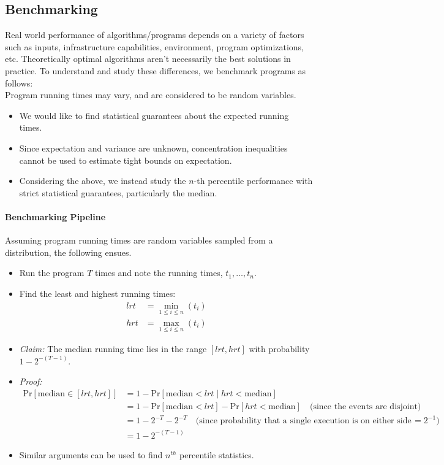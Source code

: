 \documentclass[12pt]{article}
\begin{document}
\subsection{Benchmarking}
Real world performance of algorithms/programs depends on a variety of factors such as inputs, infrastructure capabilities, environment, program optimizations, etc.  
Theoretically optimal algorithms aren't necessarily the best solutions in practice. To understand and study these differences, we benchmark programs as follows: \\ 
Program running times may vary, and are considered to be random variables.
\begin{itemize}
    \item We would like to find statistical guarantees about the expected running times.
    \item Since expectation and variance are unknown, concentration inequalities cannot be used to estimate tight bounds on expectation.
    \item Considering the above, we instead study the $n$-th percentile performance with strict statistical guarantees, particularly the median.
\end{itemize}

\paragraph{Benchmarking Pipeline}
Assuming program running times are random variables sampled from a distribution, the following ensues.
\begin{itemize}
    \item Run the program $T$ times and note the running times, $t_1, \dots, t_n$.
    \item Find the least and highest running times:
    \begin{align*}
        lrt &= \min_{1 \leq i \leq n} (t_i) \\
        hrt &= \max_{1 \leq i \leq n} (t_i)
    \end{align*}
    \item \textit{Claim:} The median running time lies in the range $[lrt, hrt]$ with probability $1 - 2^{-(T - 1)}$.
    \item \textit{Proof:}
    \begin{align*}
        \text{Pr}[\text{median} \in [lrt, hrt]] &= 1 - \text{Pr}[\text{median} < lrt \mid hrt < \text{median}] \\
                                                &= 1 - \text{Pr}[\text{median} < lrt] - \text{Pr}[hrt < \text{median}] \quad \text{(since the events are disjoint)} \\
                                                &= 1 - 2^{-T} - 2^{-T} \quad \text{(since probability that a single execution is on either side } = 2^{-1}) \\
                                                &= 1 - 2^{-(T - 1)}
    \end{align*}
    \item Similar arguments can be used to find $n^{th}$ percentile statistics.
\end{itemize}
\end{document}
